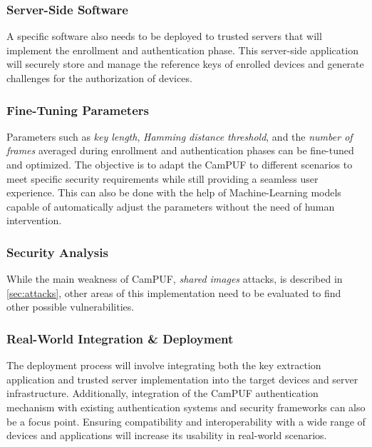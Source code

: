 \subsubsection{Server-Side Software}

A specific software also needs to be deployed to trusted servers that will implement the enrollment and authentication phase. This server-side application will securely store and manage the reference keys of enrolled devices and generate challenges for the authorization of devices.

\subsubsection{Fine-Tuning Parameters}

Parameters such as \emph{key length}, \emph{Hamming distance threshold}, and the \emph{number of frames} averaged during enrollment and authentication phases can be fine-tuned and optimized. The objective is to adapt the CamPUF to different scenarios to meet specific security requirements while still providing a seamless user experience. This can also be done with the help of Machine-Learning models capable of automatically adjust the parameters without the need of human intervention.

\subsubsection{Security Analysis}

While the main weakness of CamPUF, \emph{shared images} attacks, is described in \ref{sec:attacks}, other areas of this implementation need to be evaluated to find other possible vulnerabilities.

\subsubsection{Real-World Integration \& Deployment}

The deployment process will involve integrating both the key extraction application and trusted server implementation into the target devices and server infrastructure. Additionally, integration of the CamPUF authentication mechanism with existing authentication systems and security frameworks can also be a focus point. Ensuring compatibility and interoperability with a wide range of devices and applications will increase its usability in real-world scenarios.